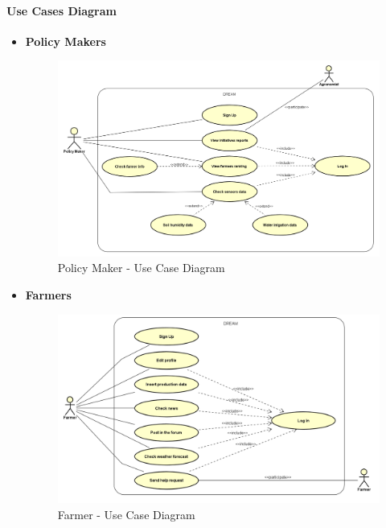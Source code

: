 \documentclass[table, 12pt]{article}
\begin{document}
\paragraph{Use Cases Diagram}
\begin{itemize}
    \item \textbf {Policy Makers}
    \begin{center}
        \begin{figure}[H]
            \includegraphics[scale=0.55, center]{assets/Use cases/UseCase_PolicyMaker.png}
            \caption{Policy Maker - Use Case Diagram}
            \label{fig: UseCase_PolicyMaker}
        \end{figure}
    \end{center}
    \newpage
    \item \textbf {Farmers}
    \begin{center}
        \begin{figure}[H]
            \includegraphics[scale=0.60, center]{assets/Use cases/UseCase_Farmer.png}
            \caption{Farmer - Use Case Diagram}

\end{figure}
\end{center}
\end{itemize}
\end{document}

